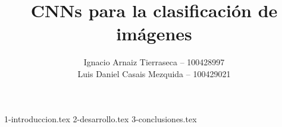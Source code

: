 \documentclass[es]{uc3mreport}
\author{
  Ignacio Arnaiz Tierraseca -- 100428997\\
  Luis Daniel Casais Mezquida -- 100429021
}
\title{CNNs para la clasificación de imágenes}
\begin{document}
  \makecover[old]

  \begin{report}
    {1-introduccion.tex}
    {2-desarrollo.tex}
    {3-conclusiones.tex}
  \end{report}
\end{document}
